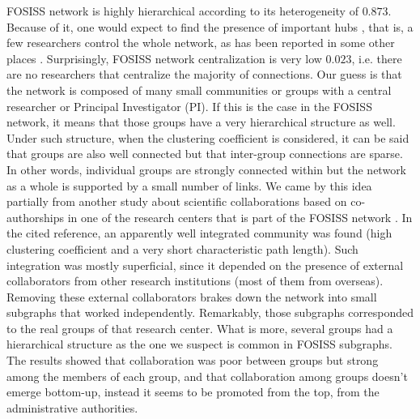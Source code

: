 \documentclass{bmcart}
\begin{document}
  FOSISS network is highly hierarchical according to its
  heterogeneity of $0.873$. Because of it, one would expect to find
  the presence of important hubs \cite{Wu:2008}, that is, a few
  researchers control the whole network, as has been reported in some
  other places \cite{yousefi-etal:2008}. Surprisingly, FOSISS network
  centralization is very low $0.023$, i.e. there are no researchers
  that centralize the majority of connections. Our guess is that the
  network is composed of many small communities or groups with a
  central researcher or Principal Investigator (PI). If this is the
  case in the FOSISS network, it means that those groups have a very
  hierarchical structure as well.\\

  Under such structure, when the clustering coefficient is
  considered, it can be said that groups are also well connected but
  that inter-group connections are sparse. In other words, individual
  groups are strongly connected within but the network as a whole is
  supported by a small number of links. We came by this idea partially
  from another study about scientific collaborations based on
  co-authorships in one of the research centers that is part of the
  FOSISS network \cite{HernandezLemus:2013}. In the cited reference, an
  apparently well integrated community was found (high clustering
  coefficient and a very short characteristic path length). Such
  integration was mostly superficial, since it depended on the
  presence of external collaborators from other research institutions
  (most of them from overseas).  Removing these external collaborators
  brakes down the network into small subgraphs that worked
  independently. Remarkably, those subgraphs corresponded to the real
  groups of that research center.  What is more, several groups had a
  hierarchical structure as the one we suspect is common in FOSISS
  subgraphs. The results showed that collaboration was poor between
  groups but strong among the members of each group, and that
  collaboration among groups doesn't emerge bottom-up, instead it
  seems to be promoted from the top, from the administrative
  authorities.\\
\end{document}
